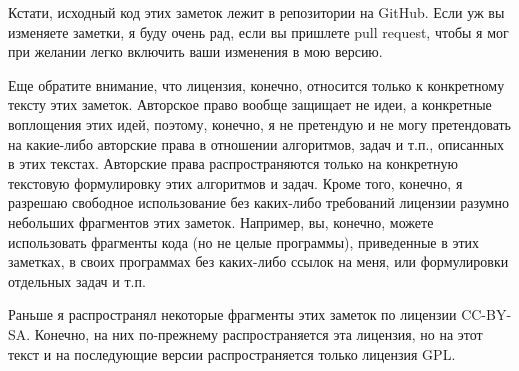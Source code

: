 Кстати, исходный код этих заметок лежит в репозитории на GitHub. Если уж вы изменяете заметки, я буду очень рад, если вы пришлете pull request, чтобы я мог при желании легко включить ваши изменения в мою версию.

Еще обратите внимание, что лицензия, конечно, относится только к конкретному тексту этих заметок. Авторское право вообще защищает не идеи, а конкретные воплощения этих идей, поэтому, конечно, я не претендую и не могу претендовать на какие-либо авторские права в отношении алгоритмов, задач и т.п., описанных в этих текстах. Авторские права распространяются только на конкретную текстовую формулировку этих алгоритмов и задач.
Кроме того, конечно, я разрешаю свободное использование без каких-либо требований лицензии разумно небольших фрагментов этих заметок. Например, вы, конечно, можете использовать фрагменты кода (но не целые программы), приведенные в этих заметках, в своих программах без каких-либо ссылок на меня, или формулировки отдельных задач и т.п.

Раньше я распространял некоторые фрагменты этих заметок по лицензии CC-BY-SA. Конечно, на них по-прежнему распространяется эта лицензия, но на этот текст и на последующие версии распространяется только лицензия GPL.